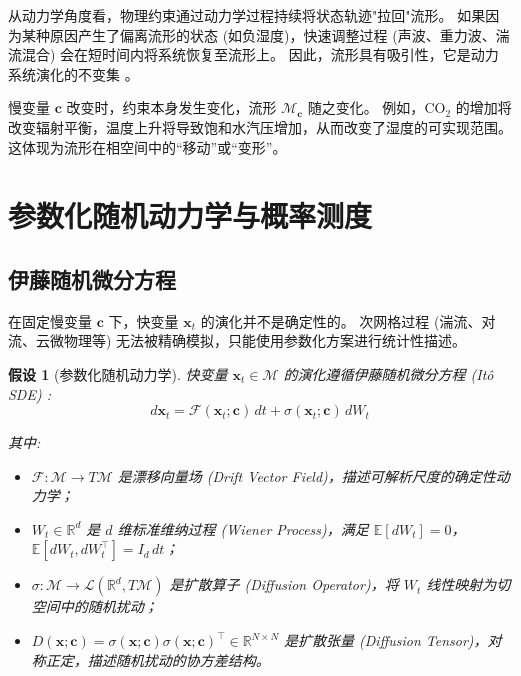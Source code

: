 \documentclass[12pt, a4paper]{article}
\newtheorem{assumption}{假设}[section]
\newcommand{\R}{\mathbb{R}}
\newcommand{\E}{\mathbb{E}}
\newcommand{\manifold}{\mathcal{M}}
\newcommand{\fastvar}{\bm{x}}          %
\newcommand{\slowvar}{\bm{c}}          %
\newcommand{\drift}{\mathcal{F}}  %
\newcommand{\diffop}{\sigma}      %
\newcommand{\difftensor}{D}       %
\newcommand{\wiener}{W}           %
\begin{document}
从动力学角度看，物理约束通过动力学过程持续将状态轨迹"拉回"流形。
如果因为某种原因产生了偏离流形的状态 (如负湿度)，快速调整过程 (声波、重力波、湍流混合) 会在短时间内将系统恢复至流形上。
因此，流形具有吸引性，它是动力系统演化的不变集 \cite{ghil2008climate}。

慢变量 $\slowvar$ 改变时，约束本身发生变化，流形 $\manifold_{\slowvar}$ 随之变化。
例如，$\text{CO}_2$ 的增加将改变辐射平衡，温度上升将导致饱和水汽压增加，从而改变了湿度的可实现范围。
这体现为流形在相空间中的“移动”或“变形”。



\section{参数化随机动力学与概率测度}

\subsection{伊藤随机微分方程}

在固定慢变量 $\slowvar$ 下，快变量 $\fastvar_t$ 的演化并不是确定性的。
次网格过程 (湍流、对流、云微物理等) 无法被精确模拟，只能使用参数化方案进行统计性描述。

\begin{assumption}[参数化随机动力学]
\label{ass:stochastic_dynamics}
    快变量 $\fastvar_t \in \manifold$ 的演化遵循伊藤随机微分方程 (Itô SDE) \cite{pavliotis2014stochastic}:
    \begin{equation}
    \label{eq:sde}
        d\fastvar_t = \drift(\fastvar_t; \slowvar)\,dt + \diffop(\fastvar_t; \slowvar)\,d\wiener_t
    \end{equation}

    其中:
    \begin{itemize}
        \item $\drift: \manifold \to T\manifold$ 是漂移向量场 (Drift Vector Field)，描述可解析尺度的确定性动力学；
        \item $\wiener_t \in \R^d$ 是 $d$ 维标准维纳过程 (Wiener Process)，满足 $\E[d\wiener_t] = 0$，$\E[d\wiener_t, d\wiener_t^\top] = I_d\,dt$；
        \item $\diffop: \manifold \to \mathcal{L}(\R^d, T\manifold)$ 是扩散算子 (Diffusion Operator)，将 $\wiener_t$ 线性映射为切空间中的随机扰动；
        \item $\difftensor(\fastvar; \slowvar) = \diffop(\fastvar; \slowvar)\diffop(\fastvar; \slowvar)^\top \in \R^{N \times N}$ 是扩散张量 (Diffusion Tensor)，对称正定，描述随机扰动的协方差结构。
    \end{itemize}
\end{assumption}
\end{document}
